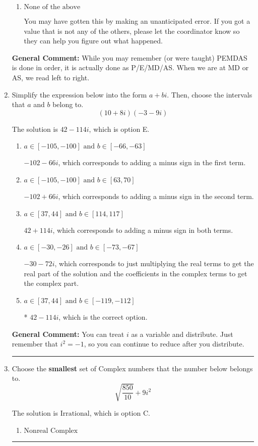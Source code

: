 \documentclass{extbook}[14pt]
\newcommand{\litem}[1]{\item #1

\rule{\textwidth}{0.4pt}}
\begin{document}
\begin{enumerate}
{\begin{enumerate}[label=\Alph*.]
 -130.992, which corresponds to an Order of Operations error: not reading left-to-right for multiplication/division.
\item \( \text{None of the above} \)

 You may have gotten this by making an unanticipated error. If you got a value that is not any of the others, please let the coordinator know so they can help you figure out what happened.
\end{enumerate}

\textbf{General Comment:} While you may remember (or were taught) PEMDAS is done in order, it is actually done as P/E/MD/AS. When we are at MD or AS, we read left to right.
}
\litem{
Simplify the expression below into the form $a+bi$. Then, choose the intervals that $a$ and $b$ belong to.
\[ (10 + 8 i)(-3 - 9 i) \]

The solution is \( 42 - 114 i \), which is option E.\begin{enumerate}[label=\Alph*.]
\item \( a \in [-105, -100] \text{ and } b \in [-66, -63] \)

 $-102 - 66 i$, which corresponds to adding a minus sign in the first term.
\item \( a \in [-105, -100] \text{ and } b \in [63, 70] \)

 $-102 + 66 i$, which corresponds to adding a minus sign in the second term.
\item \( a \in [37, 44] \text{ and } b \in [114, 117] \)

 $42 + 114 i$, which corresponds to adding a minus sign in both terms.
\item \( a \in [-30, -26] \text{ and } b \in [-73, -67] \)

 $-30 - 72 i$, which corresponds to just multiplying the real terms to get the real part of the solution and the coefficients in the complex terms to get the complex part.
\item \( a \in [37, 44] \text{ and } b \in [-119, -112] \)

* $42 - 114 i$, which is the correct option.
\end{enumerate}

\textbf{General Comment:} You can treat $i$ as a variable and distribute. Just remember that $i^2=-1$, so you can continue to reduce after you distribute.
}
\litem{
Choose the \textbf{smallest} set of Complex numbers that the number below belongs to.
\[ \sqrt{\frac{850}{10}}+9i^2 \]

The solution is \( \text{Irrational} \), which is option C.\begin{enumerate}[label=\Alph*.]
\item \( \text{Nonreal Complex} \)


\end{enumerate}}
\end{enumerate}
\end{document}
